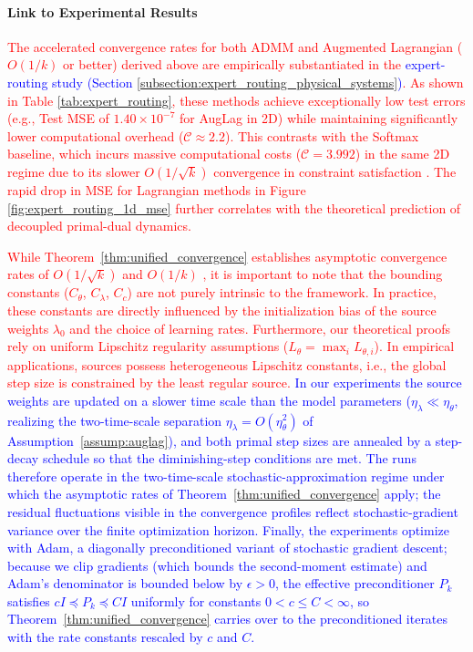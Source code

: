 \documentclass[preprint,12pt,authoryear]{elsarticle}
\begin{document}
\paragraph{Link to Experimental Results}
\textcolor{red}{The accelerated convergence rates for both ADMM and Augmented Lagrangian ($O(1/k)$ or better) derived above are empirically substantiated in the \textcolor{blue}{expert-routing study (Section \ref{subsection:expert_routing_physical_systems})}. As shown in Table \ref{tab:expert_routing}, these methods achieve exceptionally low test errors (e.g., Test MSE of $1.40 \times 10^{-7}$ for AugLag in 2D) while maintaining significantly lower computational overhead ($\mathcal{C} \approx 2.2$). This contrasts with the Softmax baseline, which incurs massive computational costs ($\mathcal{C} = 3.992$) in the same 2D regime due to its slower $O(1/\sqrt{k})$ convergence in constraint satisfaction . The rapid drop in MSE for Lagrangian methods in Figure \textcolor{blue}{\ref{fig:expert_routing_1d_mse}} further correlates with the theoretical prediction of decoupled primal-dual dynamics.}



\textcolor{red}{While Theorem~\ref{thm:unified_convergence} establishes asymptotic convergence rates of $O(1/\sqrt{k})$ and $O(1/k)$ , it is important to note that the bounding constants ($C_\theta$, $C_\lambda$, $C_c$) are not purely intrinsic to the framework. In practice, these constants are directly influenced by the initialization bias of the source weights $\lambda_0$  and the choice of learning rates. Furthermore, our theoretical proofs rely on uniform Lipschitz regularity assumptions ($L_\theta = \max_i L_{\theta,i}$). In empirical applications, sources possess heterogeneous Lipschitz constants, i.e., the global step size is constrained by the least regular source. \textcolor{blue}{In our experiments the source weights are updated on a slower time scale than the model parameters ($\eta_\lambda \ll \eta_\theta$, realizing the two-time-scale separation $\eta_\lambda = O(\eta_\theta^2)$ of Assumption~\ref{assump:auglag}), and both primal step sizes are annealed by a step-decay schedule so that the diminishing-step conditions are met. The runs therefore operate in the two-time-scale stochastic-approximation regime under which the asymptotic rates of Theorem~\ref{thm:unified_convergence} apply; the residual fluctuations visible in the convergence profiles reflect stochastic-gradient variance over the finite optimization horizon. Finally, the experiments optimize with Adam, a diagonally preconditioned variant of stochastic gradient descent; because we clip gradients (which bounds the second-moment estimate) and Adam's denominator is bounded below by $\epsilon>0$, the effective preconditioner $P_k$ satisfies $cI \preceq P_k \preceq CI$ uniformly for constants $0<c\le C<\infty$, so Theorem~\ref{thm:unified_convergence} carries over to the preconditioned iterates with the rate constants rescaled by $c$ and $C$.}}
\end{document}
